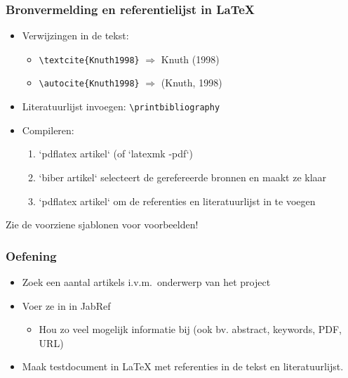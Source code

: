 \documentclass{beamer}
\begin{document}
\begin{frame}[fragile]
  \frametitle{Bronvermelding en referentielijst in {\LaTeX}}
  
  \begin{itemize}
  \item Verwijzingen in de tekst:
  
  \begin{itemize}
    \item \verb|\textcite{Knuth1998}| $\Rightarrow$ Knuth (1998)
    \item \verb|\autocite{Knuth1998}| $\Rightarrow$ (Knuth, 1998)
  \end{itemize}
  
  \item Literatuurlijst invoegen: \verb|\printbibliography|
  
  \item Compileren:
  
  \begin{enumerate}
    \item `pdflatex artikel` (of `latexmk -pdf`)
    \item `biber artikel` selecteert de gerefereerde bronnen en maakt ze klaar
    \item `pdflatex artikel` om de referenties en literatuurlijst in te voegen
  \end{enumerate}
  \end{itemize}
  
  Zie de voorziene sjablonen voor voorbeelden!
\end{frame}

\begin{frame}
  \frametitle{Oefening}

  \begin{itemize}
    \item Zoek een aantal artikels i.v.m.~onderwerp van het project
    \item Voer ze in in JabRef
      \begin{itemize}
        \item Hou zo veel mogelijk informatie bij (ook bv. abstract, keywords, PDF, URL)
      \end{itemize}
    \item Maak testdocument in {\LaTeX} met referenties in de tekst en literatuurlijst.
  \end{itemize}
\end{frame}
\end{document}
